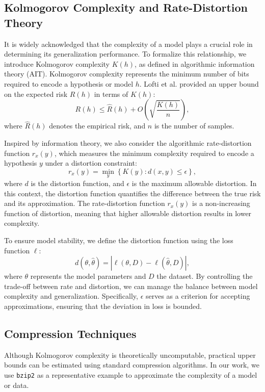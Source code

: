 \documentclass{article}
\begin{document}
\subsection{Kolmogorov Complexity and Rate-Distortion Theory}

It is widely acknowledged that the complexity of a model plays a crucial role in determining its generalization performance. To formalize this relationship, we introduce Kolmogorov complexity $K(h)$, as defined in algorithmic information theory (AIT). Kolmogorov complexity represents the minimum number of bits required to encode a hypothesis or model $h$. Lofti et al. provided an upper bound on the expected risk $R(h)$ in terms of $K(h)$:  
$$
R(h) \leq \hat{R}(h) + O\left(\sqrt{\frac{K(h)}{n}}\right),
$$  
where $\hat{R}(h)$ denotes the empirical risk, and $n$ is the number of samples. 

Inspired by information theory, we also consider the algorithmic rate-distortion function $r_x(y)$, which measures the minimum complexity required to encode a hypothesis $y$ under a distortion constraint:  
$$
r_x(y) = \min_y\left\{ K(y): d(x, y) \leq \epsilon \right\},
$$  
where $d$ is the distortion function, and $\epsilon$ is the maximum allowable distortion. In this context, the distortion function quantifies the difference between the true risk and its approximation. The rate-distortion function $r_x(y)$ is a non-increasing function of distortion, meaning that higher allowable distortion results in lower complexity.

To ensure model stability, we define the distortion function using the loss function $\ell$:  
$$
d(\theta, \hat{\theta}) = \left| \ell(\theta, D) - \ell(\hat{\theta}, D) \right|,
$$  
where $\theta$ represents the model parameters and $D$ the dataset. By controlling the trade-off between rate and distortion, we can manage the balance between model complexity and generalization. Specifically, $\epsilon$ serves as a criterion for accepting approximations, ensuring that the deviation in loss is bounded.

\subsection{Compression Techniques}

Although Kolmogorov complexity is theoretically uncomputable, practical upper bounds can be estimated using standard compression algorithms. In our work, we use \texttt{bzip2} as a representative example to approximate the complexity of a model or data.  
\end{document}
